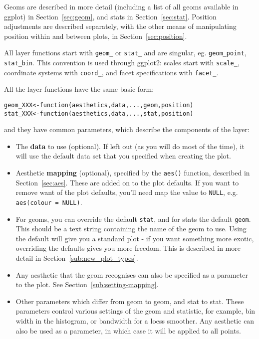 Geoms are described in more detail (including a list of all geoms available in ggplot) in Section~\ref{sec:geom}, and stats in Section~\ref{sec:stat}.  Position adjustments are described separately, with the other means of manipulating position within and between plots, in Section~\ref{sec:position}.

All layer functions start with {\tt geom\_} or {\tt stat\_} and are singular, eg. {\tt geom\_point}, {\tt stat\_bin}.  This convention is used through ggplot2: scales start with {\tt scale\_}, coordinate systems with {\tt coord\_}, and facet specifications with {\tt facet\_}.

All the layer functions have the same basic form:

\begin{alltt}
geom_XXX <- function(aesthetics, data, ..., geom, position) {}
stat_XXX <- function(aesthetics, data, ..., stat, position) {}
\end{alltt}

\noindent and they have common parameters, which describe the components of the layer:

\begin{itemize}
	\item The {\bf data} to use (optional).  If left out (as you will do most of the time), it will use the default data set that you specified when creating the plot.  

	\item Aesthetic {\bf mapping} (optional), specified by the {\tt aes()} function, described in Section~\ref{sec:aes}.  These are added on to the plot defaults.  If you want to remove want of the plot defaults, you'll need map the value to {\tt NULL}, e.g. {\tt aes(colour = NULL)}.
	
	\item For geoms, you can override the default {\tt stat}, and for stats the default {\tt geom}.  This should be a text string containing the name of the geom to use.  Using the default will give you a standard plot - if you want something more exotic, overriding the defaults gives you more freedom.  This is described in more detail in Section~\ref{sub:new_plot_types}.
	
	\item Any aesthetic that the geom recognises can also be specified as a parameter to the plot.  See Section~\ref{sub:setting-mapping}.

	\item Other parameters which differ from geom to geom, and stat to stat.  These parameters control various settings of the geom and statistic, for example, bin width in the histogram, or bandwidth for a loess smoother.  Any aesthetic can also be used as a parameter, in which case it will be applied to all points.
\end{itemize}

